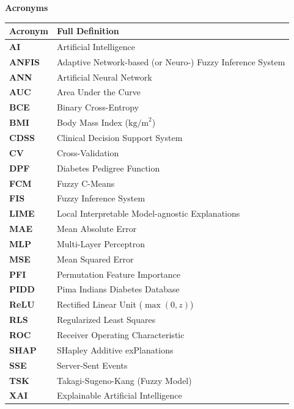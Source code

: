 \documentclass{report}
\begin{document}
{\linespread{0.95}\selectfont
\begin{center}
{\fontsize{11}{14}\selectfont \bfseries Acronyms}\\[0.15cm]
\footnotesize
\begin{tabularx}{\textwidth}{l X}
\toprule
\textbf{Acronym} & \textbf{Full Definition} \\
\midrule
\textbf{AI} & Artificial Intelligence \\
\textbf{ANFIS} & Adaptive Network-based (or Neuro-) Fuzzy Inference System \\
\textbf{ANN} & Artificial Neural Network \\
\textbf{AUC} & Area Under the Curve \\
\textbf{BCE} & Binary Cross-Entropy \\
\textbf{BMI} & Body Mass Index ($\text{kg/m}^2$) \\
\textbf{CDSS} & Clinical Decision Support System \\
\textbf{CV} & Cross-Validation \\
\textbf{DPF} & Diabetes Pedigree Function \\
\textbf{FCM} & Fuzzy C-Means \\
\textbf{FIS} & Fuzzy Inference System \\
\textbf{LIME} & Local Interpretable Model-agnostic Explanations \\
\textbf{MAE} & Mean Absolute Error \\
\textbf{MLP} & Multi-Layer Perceptron \\
\textbf{MSE} & Mean Squared Error \\
\textbf{PFI} & Permutation Feature Importance \\
\textbf{PIDD} & Pima Indians Diabetes Database \\
\textbf{ReLU} & Rectified Linear Unit ($\max(0, z)$) \\
\textbf{RLS} & Regularized Least Squares \\
\textbf{ROC} & Receiver Operating Characteristic \\
\textbf{SHAP} & SHapley Additive exPlanations \\
\textbf{SSE} & Server-Sent Events \\
\textbf{TSK} & Takagi-Sugeno-Kang (Fuzzy Model) \\
\textbf{XAI} & Explainable Artificial Intelligence \\
\bottomrule
\end{tabularx}
\end{center}

}
\end{document}
